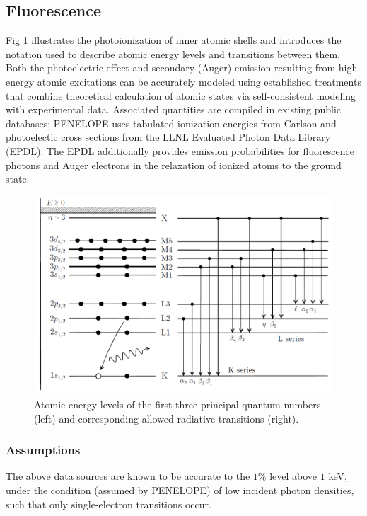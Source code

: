 \documentclass [11pt, proquest, article] {uwthesis}[2016/11/22]
\begin{document}
\subsection{Fluorescence}
Fig \ref{fig:photoionization} illustrates the photoionization of inner atomic shells and introduces the notation used to describe atomic energy levels and transitions between them.
Both the photoelectric effect and secondary (Auger) emission resulting from high-energy atomic excitations can be accurately modeled using established treatments that combine theoretical calculation of atomic states via self-consistent modeling with experimental data.\cite{pratt1973atomic} Associated quantities are compiled in existing public databases; PENELOPE uses tabulated ionization energies from Carlson  and photoelectic cross sections from the LLNL Evaluated Photon Data Library (EPDL). The EPDL additionally provides emission probabilities for fluorescence photons and Auger electrons in the relaxation of ionized atoms to the ground state.

\begin{figure}[h] 
\caption{Atomic energy levels of the first three principal quantum numbers (left) and corresponding allowed radiative transitions (right).}
\label{fig:photoionization}
\centering
\includegraphics[scale=0.4]{../Figures/penelope_2_2.png}
\end{figure}



\subsubsection{Assumptions}
The above data sources are known to be accurate to the $1\%$ level above $1$ keV, under the condition (assumed by PENELOPE) of low incident photon densities, such that only single-electron transitions occur.\cite{salvat2008penelope}
\end{document}
